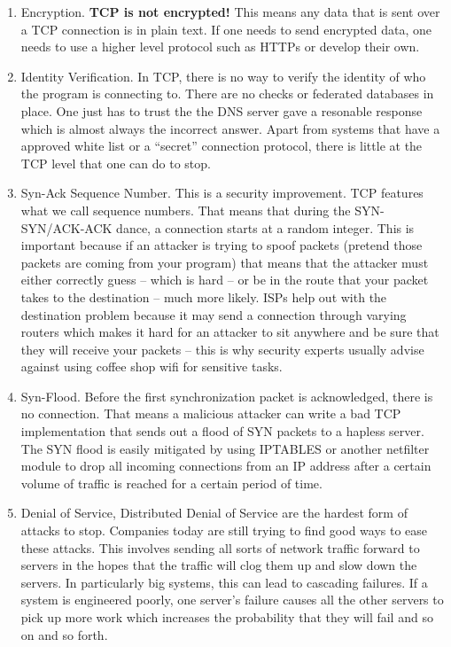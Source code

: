 \begin{enumerate}
\item Encryption. \textbf{TCP is not encrypted!} This means any data that is sent over a TCP connection is in plain text. If one needs to send encrypted data, one needs to use a higher level protocol such as HTTPs or develop their own.
\item Identity Verification. In TCP, there is no way to verify the identity of who the program is connecting to. There are no checks or federated databases in place. One just has to trust the the DNS server gave a resonable response which is almost always the incorrect answer. Apart from systems that have a approved white list or a ``secret'' connection protocol, there is little at the TCP level that one can do to stop.
\item Syn-Ack Sequence Number. This is a security improvement. TCP features what we call sequence numbers. That means that during the SYN-SYN/ACK-ACK dance, a connection starts at a random integer. This is important because if an attacker is trying to spoof packets (pretend those packets are coming from your program) that means that the attacker must either correctly guess -- which is hard -- or be in the route that your packet takes to the destination -- much more likely. ISPs help out with the destination problem because it may send a connection through varying routers which makes it hard for an attacker to sit anywhere and be sure that they will receive your packets -- this is why security experts usually advise against using coffee shop wifi for sensitive tasks.
\item Syn-Flood. Before the first synchronization packet is acknowledged, there is no connection. That means a malicious attacker can write a bad TCP implementation that sends out a flood of SYN packets to a hapless server. The SYN flood is easily mitigated by using IPTABLES or another netfilter module to drop all incoming connections from an IP address after a certain volume of traffic is reached for a certain period of time.
\item Denial of Service, Distributed Denial of Service are the hardest form of attacks to stop. Companies today are still trying to find good ways to ease these attacks. This involves sending all sorts of network traffic forward to servers in the hopes that the traffic will clog them up and slow down the servers. In particularly big systems, this can lead to cascading failures. If a system is engineered poorly, one server's failure causes all the other servers to pick up more work which increases the probability that they will fail and so on and so forth.
\end{enumerate}

